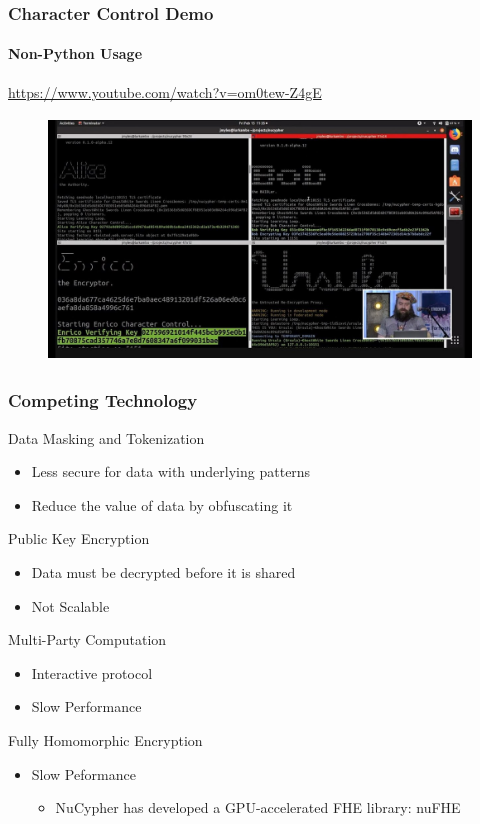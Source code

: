 \documentclass[xetex,mathsans,sans,aspectratio=169]{beamer}
\begin{document}
    \begin{frame}
        \frametitle{Character Control Demo}
        \framesubtitle{Non-Python Usage}
        \url{https://www.youtube.com/watch?v=om0tew-Z4gE}
        \begin{figure}
            \centering
            \includegraphics[height=6.5cm]{pdf/ethdenver.jpg}
        \end{figure}
    \end{frame}

    \begin{frame}
      \frametitle{Competing Technology}
       Data Masking and Tokenization
       \begin{itemize}
           \item Less secure for data with underlying patterns
           \item Reduce the value of data by obfuscating it
       \end{itemize}

       Public Key Encryption
       \begin{itemize}
           \item Data must be decrypted before it is shared
           \item Not Scalable
       \end{itemize}

       Multi-Party Computation
       \begin{itemize}
           \item Interactive protocol
           \item Slow Performance
       \end{itemize}

       Fully Homomorphic Encryption
       \begin{itemize}
           \item Slow Peformance
           \begin{itemize}
               \item NuCypher has developed a GPU-accelerated FHE library: nuFHE
           \end{itemize}
       \end{itemize}
     \end{frame}
\end{document}
